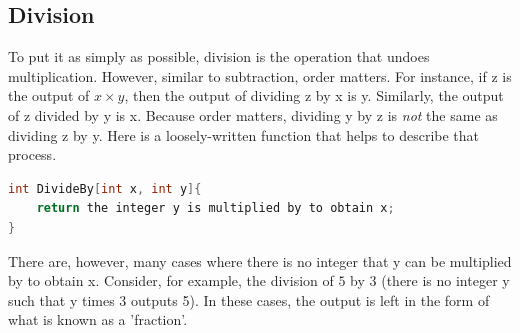 \subsection{Division}
To put it as simply as possible, division is the operation that undoes multiplication. However, similar to subtraction, order matters. For instance, if z is the output of $x\times y$, then the output of dividing z by x is y. Similarly, the output of z divided by y is x. Because order matters, dividing y by z is \emph{not} the same as dividing z by y. Here is a loosely-written function that helps to describe that process.
\begin{center}
\begin{lstlisting}[language=C,caption=Division Function,label=lst:divFunc]
int DivideBy[int x, int y]{
	return the integer y is multiplied by to obtain x;
}
\end{lstlisting}
\end{center}
There are, however, many cases where there is no integer that y can be multiplied by to obtain x. Consider, for example, the division of $5$ by $3$ (there is no integer y such that y times 3 outputs 5). In these cases, the output is left in the form of what is known as a 'fraction'.
























